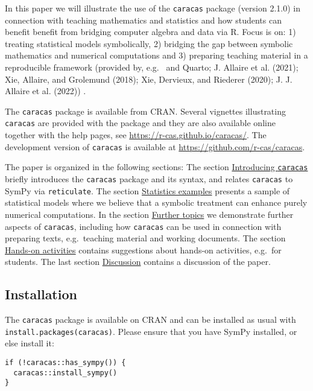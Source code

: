 In this paper we will illustrate the use of the \texttt{caracas} package
(version 2.1.0) in connection with teaching mathematics and statistics
and how students can benefit benefit from bridging computer algebra and data
via R.
Focus is on: 1) treating statistical models symbolically, 2)
bridging the gap between symbolic mathematics and numerical
computations and 3) preparing teaching material in a reproducible
framework
(provided by, e.g.~ and Quarto; J. Allaire et al. (2021); Xie, Allaire, and Grolemund (2018); Xie, Dervieux, and Riederer (2020); J. J. Allaire et al. (2022))
.

The \texttt{caracas} package is available from CRAN. Several vignettes
illustrating \texttt{caracas} are provided with the package and they are also
available online together with the help pages, see
\url{https://r-cas.github.io/caracas/}. The development
version of \texttt{caracas} is available at
\url{https://github.com/r-cas/caracas}.

The paper is organized in the following sections: The section
\protect\hyperlink{introducing-caracas}{Introducing \texttt{caracas}} briefly introduces
the \texttt{caracas} package and its syntax, and
relates \texttt{caracas} to SymPy via \texttt{reticulate}.
The section \protect\hyperlink{statistics-examples}{Statistics examples} presents a sample of statistical models
where we believe that a
symbolic treatment can enhance purely numerical computations.
In the section \protect\hyperlink{further-topics}{Further topics} we
demonstrate further aspects of \texttt{caracas}, including how \texttt{caracas} can be
used in connection with preparing texts, e.g.~teaching material and
working documents.
The section \protect\hyperlink{hands-on-activities}{Hands-on activities}
contains suggestions about hands-on activities, e.g.~for students.
The last section \protect\hyperlink{discussion}{Discussion} contains a discussion of the
paper.

\hypertarget{installation}{%
\subsection{Installation}\label{installation}}

The \texttt{caracas} package is available on CRAN and can be installed as usual with \texttt{install.packages(\textquotesingle{}caracas\textquotesingle{})}.
Please ensure that you have SymPy installed, or else install it:

\begin{verbatim}
if (!caracas::has_sympy()) {
  caracas::install_sympy()
}
\end{verbatim}

